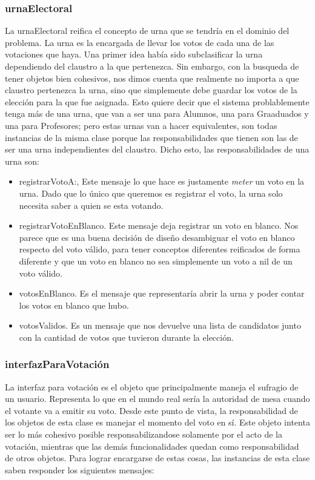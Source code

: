 \subsubsection{urnaElectoral}

La urnaElectoral reifica el concepto de urna que se tendr\'ia en el dominio del problema. La urna es la encargada de llevar los votos de cada una de las votaciones que haya. Una primer idea hab\'ia sido subclasificar la urna dependiendo del claustro a la que pertenezca. Sin embargo, con la busqueda de tener objetos bien cohesivos, nos dimos cuenta que realmente no importa a que claustro pertenezca la urna, sino que simplemente debe guardar los votos de la elecci\'on para la que fue asignada. Esto quiere decir que el sistema problablemente tenga m\'as de una urna, que van a ser una para Alumnos, una para Graaduados y una para Profesores; pero estas urnas van a hacer equivalentes, son todas instancias de la misma clase porque las responsabilidades que tienen son las de ser una urna independientes del claustro. Dicho esto, las responsabilidades de una urna son:

\begin{itemize} 
\item registrarVotoA:, Este mensaje lo que hace es justamente \emph{meter} un voto en la urna. Dado que lo \'unico que queremos es registrar el voto, la urna solo necesita saber a quien se esta votando.
\item registrarVotoEnBlanco. Este mensaje deja registrar un voto en blanco. Nos parece que es una buena decisi\'on de diseño desambiguar el voto en blanco respecto del voto v\'alido, para tener conceptos diferentes reificados de forma diferente y que un voto en blanco no sea simplemente un voto a nil de un voto v\'alido.
\item votosEnBlanco. Es el mensaje que representar\'ia abrir la urna y poder contar los votos en blanco que hubo.
\item votosValidos. Es un mensaje que nos devuelve una lista de candidatos junto con la cantidad de votos que tuvieron durante la elecci\'on.
\end{itemize}


\subsubsection{interfazParaVotaci\'on}

La interfaz para votaci\'on es el objeto que principalmente maneja el sufragio de un usuario. Representa lo que en el mundo real ser\'ia la autoridad de mesa cuando el votante va a emitir su voto. Desde este punto de vista, la responsabilidad de los objetos de esta clase es manejar el momento del voto en s\'i. Este objeto intenta ser lo m\'as cohesivo posible responsabilizandose solamente por el acto de la votaci\'on, mientras que las dem\'as funcionalidades quedan como responsabilidad de otros objetos. Para lograr encargarse de estas cosas, las instancias de esta clase saben responder los siguientes mensajes:

